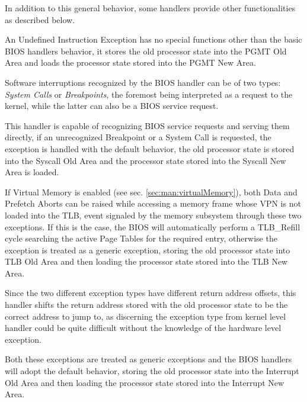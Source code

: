 In addition to this general behavior, some handlers provide other functionalities as described below.


An Undefined Instruction Exception has no special functions other than the basic BIOS handlers behavior, it stores the old processor state into the PGMT Old Area and loads the processor state stored into the PGMT New Area.


Software interruptions recognized by the BIOS handler can be of two types: \emph{System Calls} or \emph{Breakpoints}, the foremost being interpreted as a request to the kernel, while the latter can also be a BIOS service request.

This handler is capable of recognizing BIOS service requests and serving them directly, if an unrecognized Breakpoint or a System Call is requested, the exception is handled with the default behavior, the old processor state is stored into the Syscall Old Area and the processor state stored into the Syscall New Area is loaded.


If Virtual Memory is enabled (see sec. \ref{sec:man:virtualMemory}), both Data and Prefetch Aborts can be raised while accessing a memory frame whose VPN is not loaded into the TLB, event signaled by the memory subsystem through these two exceptions.
If this is the case, the BIOS will automatically perform a TLB\_Refill cycle searching the active Page Tables for the required entry, otherwise the exception is treated as a generic exception, storing the old processor state into TLB Old Area and then loading the processor state stored into the TLB New Area.

Since the two different exception types have different return address offsets, this handler shifts the return address stored with the old processor state to be the correct address to jump to, as discerning the exception type from kernel level handler could be quite difficult without the knowledge of the hardware level exception.


Both these exceptions are treated as generic exceptions and the BIOS handlers will adopt the default behavior, storing the old processor state into the Interrupt Old Area and then loading the processor state stored into the Interrupt New Area.


